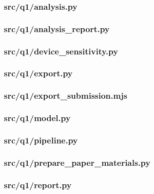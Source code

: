 \documentclass[zihao=-4,a4paper,UTF8,fontset=none]{ctexart}
\begin{document}
\subsubsection*{src/q1/analysis.py}


\subsubsection*{src/q1/analysis\_report.py}


\subsubsection*{src/q1/device\_sensitivity.py}


\subsubsection*{src/q1/export.py}


\subsubsection*{src/q1/export\_submission.mjs}


\subsubsection*{src/q1/model.py}


\subsubsection*{src/q1/pipeline.py}


\subsubsection*{src/q1/prepare\_paper\_materials.py}


\subsubsection*{src/q1/report.py}

\end{document}
